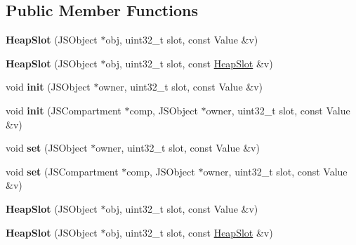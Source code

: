 \subsection*{Public Member Functions}
\begin{DoxyCompactItemize}
\item 
\hypertarget{classjs_1_1_heap_slot_a78744d3d1a9659f4cab35805e91f3bea}{{\bfseries Heap\-Slot} (J\-S\-Object $\ast$obj, uint32\-\_\-t slot, const Value \&v)}\label{classjs_1_1_heap_slot_a78744d3d1a9659f4cab35805e91f3bea}

\item 
\hypertarget{classjs_1_1_heap_slot_add3c7ea537ce6eba84bd74a6079f53d1}{{\bfseries Heap\-Slot} (J\-S\-Object $\ast$obj, uint32\-\_\-t slot, const \hyperlink{classjs_1_1_heap_slot}{Heap\-Slot} \&v)}\label{classjs_1_1_heap_slot_add3c7ea537ce6eba84bd74a6079f53d1}

\item 
\hypertarget{classjs_1_1_heap_slot_a3fa6582df922df07325f2a136c7d0312}{void {\bfseries init} (J\-S\-Object $\ast$owner, uint32\-\_\-t slot, const Value \&v)}\label{classjs_1_1_heap_slot_a3fa6582df922df07325f2a136c7d0312}

\item 
\hypertarget{classjs_1_1_heap_slot_ad600343e01468808115e977e1e5a40a1}{void {\bfseries init} (J\-S\-Compartment $\ast$comp, J\-S\-Object $\ast$owner, uint32\-\_\-t slot, const Value \&v)}\label{classjs_1_1_heap_slot_ad600343e01468808115e977e1e5a40a1}

\item 
\hypertarget{classjs_1_1_heap_slot_abfbe173966984c3dace40e97486f9a81}{void {\bfseries set} (J\-S\-Object $\ast$owner, uint32\-\_\-t slot, const Value \&v)}\label{classjs_1_1_heap_slot_abfbe173966984c3dace40e97486f9a81}

\item 
\hypertarget{classjs_1_1_heap_slot_a9745854e3abc10e23925dbb750031337}{void {\bfseries set} (J\-S\-Compartment $\ast$comp, J\-S\-Object $\ast$owner, uint32\-\_\-t slot, const Value \&v)}\label{classjs_1_1_heap_slot_a9745854e3abc10e23925dbb750031337}

\item 
\hypertarget{classjs_1_1_heap_slot_a78744d3d1a9659f4cab35805e91f3bea}{{\bfseries Heap\-Slot} (J\-S\-Object $\ast$obj, uint32\-\_\-t slot, const Value \&v)}\label{classjs_1_1_heap_slot_a78744d3d1a9659f4cab35805e91f3bea}

\item 
\hypertarget{classjs_1_1_heap_slot_add3c7ea537ce6eba84bd74a6079f53d1}{{\bfseries Heap\-Slot} (J\-S\-Object $\ast$obj, uint32\-\_\-t slot, const \hyperlink{classjs_1_1_heap_slot}{Heap\-Slot} \&v)}\label{classjs_1_1_heap_slot_add3c7ea537ce6eba84bd74a6079f53d1}


\end{DoxyCompactItemize}
